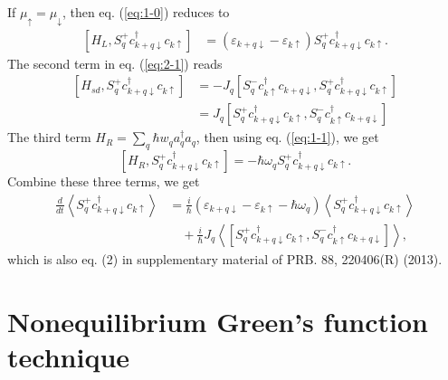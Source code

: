 \documentclass[aps,prb,superscriptaddress]{revtex4-2}
\begin{document}
If $\mu_{\uparrow} = \mu_{\downarrow}$, then eq. (\ref{eq:1-0}) reduces to
\begin{equation}
\begin{split}
\left[H_{L}, S_{q}^{+} c_{k+q \downarrow}^{\dagger} c_{k \uparrow}\right] &= \left(\varepsilon_{k+q \downarrow}-\varepsilon_{k \uparrow}\right)S_{q}^{+} c_{k+q \downarrow}^{\dagger} c_{k \uparrow}.
\end{split}
\label{eq:1-01}
\end{equation}
The second term in eq. (\ref{eq:2-1}) reads
\begin{equation}
\begin{split}
\left[H_{sd}, S_{q}^{+} c_{k+q \downarrow}^{\dagger} c_{k \uparrow}\right] &= - J_{q} \left[S_{q}^{-} c_{k \uparrow}^{\dagger} c_{k+q \downarrow}, S_{q}^{+} c_{k+q \downarrow}^{\dagger} c_{k \uparrow}\right] \\
&= J_{q} \left[S_{q}^{+} c_{k+q \downarrow}^{\dagger} c_{k \uparrow}, S_{q}^{-} c_{k \uparrow}^{\dagger} c_{k+q \downarrow}\right]
\end{split}
\end{equation}
The third term $H_{R} = \sum_{q} \hbar w_{q} a_{q}^{\dagger} a_{q}$, then using eq. (\ref{eq:1-1}), we get
\begin{equation}
\left[H_{R}, S_{q}^{+} c_{k+q \downarrow}^{\dagger} c_{k \uparrow}\right] = -\hbar \omega_{q}S_{q}^{+} c_{k+q \downarrow}^{\dagger} c_{k \uparrow}.
\end{equation}
Combine these three terms, we get
\begin{equation}
\begin{split}
\frac{d}{d t}\left\langle S_{q}^{+} c_{k+q \downarrow}^{\dagger} c_{k \uparrow}\right\rangle&=\frac{i}{\hbar}\left(\varepsilon_{k+q \downarrow}-\varepsilon_{k \uparrow}-\hbar \omega_{q}\right)\left\langle S_{q}^{+} c_{k+q \downarrow}^{\dagger} c_{k \uparrow}\right\rangle\\ 
&\quad + \frac{i}{\hbar} J_{q}\left\langle\left[S_{q}^{+} c_{k+q \downarrow}^{\dagger} c_{k \uparrow}, S_{q}^{-} c_{k \uparrow}^{\dagger} c_{k+q \downarrow}\right]\right\rangle,
\end{split}
\end{equation}
which is also eq. (2) in supplementary material of PRB. 88, 220406(R) (2013).

\section{Nonequilibrium Green's function technique}
\end{document}
